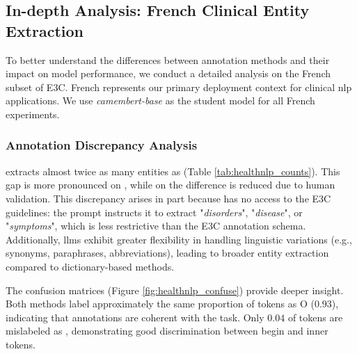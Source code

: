 
\subsection{In-depth Analysis: French Clinical Entity Extraction}
\label{sec:french_case_study}

To better understand the differences between annotation methods and their impact on model performance, we conduct a detailed analysis on the French subset of E3C. French represents our primary deployment context for clinical \gls{nlp} applications. We use \textit{camembert-base} \citep{Martin2019CamemBERT:Model} as the student model for all French experiments.

\subsubsection{Annotation Discrepancy Analysis}

\instruct extracts almost twice as many entities as \dict (Table \ref{tab:healthnlp_counts}). This gap is more pronounced on \Ssilver, while on \Sval the difference is reduced due to human validation. This discrepancy arises in part because \instruct has no access to the E3C guidelines: the prompt instructs it to extract "\textit{disorders}", "\textit{disease}", or "\textit{symptoms}", which is less restrictive than the E3C annotation schema.
Additionally, \glspl{llm} exhibit greater flexibility in handling linguistic variations (e.g., synonyms, paraphrases, abbreviations), leading to broader entity extraction compared to dictionary-based methods.

\begin{table}
    \centering
    \small
    \resizebox{0.85\textwidth}{!}{
        
    }
    \caption{Number of annotated tokens for each annotation type across French E3C layers.}
    \label{tab:healthnlp_counts}
\end{table}

The confusion matrices (Figure \ref{fig:healthnlp_confuse}) provide deeper insight. Both methods label approximately the same proportion of tokens as O ($0.93$), indicating that \instruct annotations are coherent with the task. Only $0.04$ of \bclin tokens are mislabeled as \iclin, demonstrating good discrimination between begin and inner tokens.

